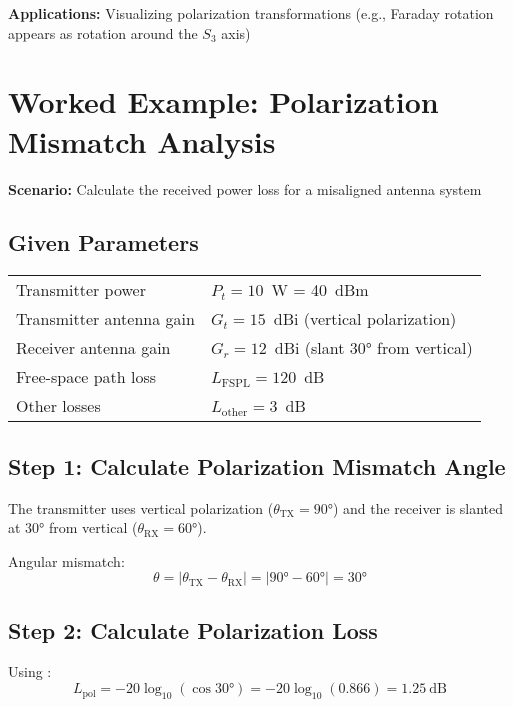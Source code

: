 \textbf{Applications:} Visualizing polarization transformations (e.g., Faraday rotation appears as rotation around the $S_3$ axis)

\section{Worked Example: Polarization Mismatch Analysis}

\textbf{Scenario:} Calculate the received power loss for a misaligned antenna system

\subsection*{Given Parameters}

\noindent
\begin{tabular}{@{}ll@{}}
Transmitter power & $P_t = 10$~W = 40~dBm \\
Transmitter antenna gain & $G_t = 15$~dBi (vertical polarization) \\
Receiver antenna gain & $G_r = 12$~dBi (slant $30°$ from vertical) \\
Free-space path loss & $L_{\text{FSPL}} = 120$~dB \\
Other losses & $L_{\text{other}} = 3$~dB \\
\end{tabular}

\subsection*{Step 1: Calculate Polarization Mismatch Angle}

The transmitter uses vertical polarization ($\theta_{\text{TX}} = 90°$) and the receiver is slanted at $30°$ from vertical ($\theta_{\text{RX}} = 60°$).

Angular mismatch:
\begin{equation}
\theta = |\theta_{\text{TX}} - \theta_{\text{RX}}| = |90° - 60°| = 30°
\end{equation}

\subsection*{Step 2: Calculate Polarization Loss}

Using :
\begin{equation}
L_{\text{pol}} = -20\log_{10}(\cos 30°) = -20\log_{10}(0.866) = 1.25~\text{dB}
\end{equation}

